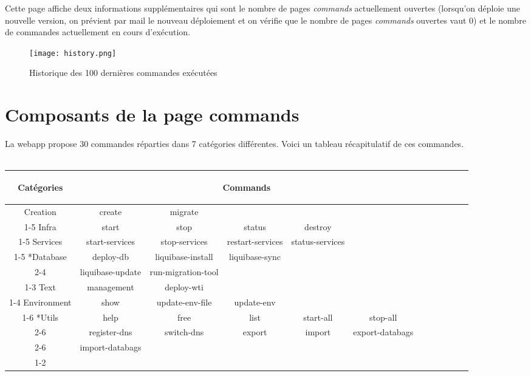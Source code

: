 Cette page affiche deux informations supplémentaires qui sont le nombre de
pages \textit{commands} actuellement ouvertes (lorsqu'on déploie une nouvelle
version, on prévient par mail le nouveau déploiement et on vérifie que le nombre
de pages \textit{commands} ouvertes vaut 0) et le nombre de commandes
actuellement en cours d'exécution.

\begin{figure}[H]
  \texttt{[image: history.png]}  
  \caption{Historique des 100 dernières commandes exécutées}
\end{figure}

\clearpage
\section{Composants de la page commands}

La webapp propose 30 commandes réparties dans 7 catégories différentes.
Voici un tableau récapitulatif de ces commandes.\\\\
\begin{tabular}{|c|c|c|c|c|c|c|c|c|c|c|c|}
  \hline
  \begin{bf}Catégories\end{bf} & \multicolumn{5}{c|}{\begin{bf}Commands\end{bf}} \\
    \hline
    Creation & create & migrate \\
    \cline{1-5}
    Infra & start & stop & status & destroy \\
    \cline{1-5}
    Services & start-services & stop-services & restart-services & status-services \\
    \cline{1-5}
    \multirow{2}*{Database} & deploy-db & liquibase-install & liquibase-sync\\
    \cline{2-4}
    & liquibase-update & run-migration-tool  \\
    \cline{1-3}
    Text & management & deploy-wti \\
    \cline{1-4}
    Environment & show & update-env-file & update-env \\
    \cline{1-6}
    \multirow{3}*{Utils} & help & free & list & start-all & stop-all \\
    \cline{2-6}
    & register-dns & switch-dns & export & import & export-databags\\
    \cline{2-6}
    & import-databags \\
    \cline{1-2}
\end{tabular}


